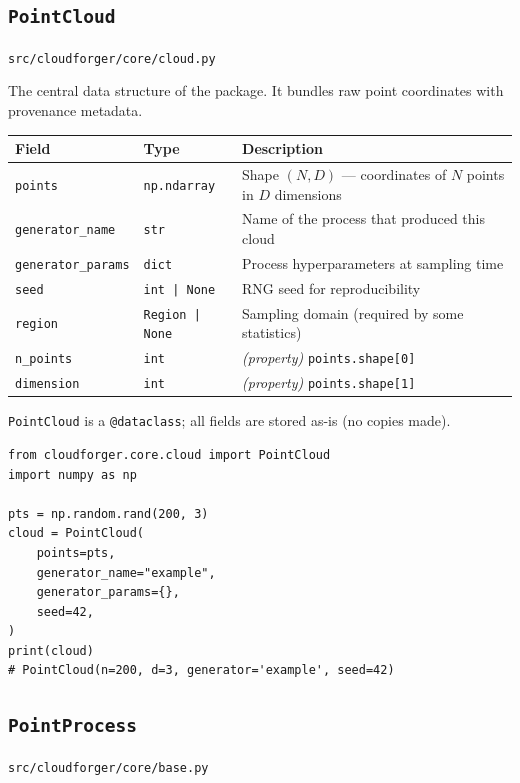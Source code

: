 \documentclass[11pt, a4paper]{article}
\newcommand{\code}[1]{\texttt{#1}}
\newcommand{\pyfile}[1]{\texttt{\small #1}}
\newcommand{\typename}[1]{\textbf{\texttt{#1}}}
\begin{document}
\subsection{\typename{PointCloud}}
\label{subsec:pointcloud}
\pyfile{src/cloudforger/core/cloud.py}

The central data structure of the package.
It bundles raw point coordinates with provenance metadata.

\begin{center}
\begin{tabular}{lll}
\toprule
\textbf{Field} & \textbf{Type} & \textbf{Description} \\
\midrule
\code{points}           & \code{np.ndarray}  & Shape $(N, D)$ --- coordinates of $N$ points in $D$ dimensions \\
\code{generator\_name}  & \code{str}         & Name of the process that produced this cloud \\
\code{generator\_params}& \code{dict}        & Process hyperparameters at sampling time \\
\code{seed}             & \code{int | None}  & RNG seed for reproducibility \\
\code{region}           & \code{Region | None} & Sampling domain (required by some statistics) \\
\midrule
\code{n\_points}  & \code{int} & \emph{(property)} \code{points.shape[0]} \\
\code{dimension}  & \code{int} & \emph{(property)} \code{points.shape[1]} \\
\bottomrule
\end{tabular}
\end{center}

\code{PointCloud} is a \code{@dataclass}; all fields are stored as-is
(no copies made).

\begin{lstlisting}
from cloudforger.core.cloud import PointCloud
import numpy as np

pts = np.random.rand(200, 3)
cloud = PointCloud(
    points=pts,
    generator_name="example",
    generator_params={},
    seed=42,
)
print(cloud)
# PointCloud(n=200, d=3, generator='example', seed=42)
\end{lstlisting}

\subsection{\typename{PointProcess}}
\label{subsec:pointprocess}
\pyfile{src/cloudforger/core/base.py}
\end{document}

